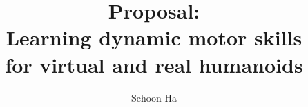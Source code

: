 \documentclass[12pt]{gatech-thesis}
\title{Proposal: \protect\\ Learning dynamic motor skills \protect\\ for virtual and real humanoids} %
\author{Sehoon Ha}
\begin{document}


\begin{preliminary}
\contents



\end{preliminary}





\end{document}
